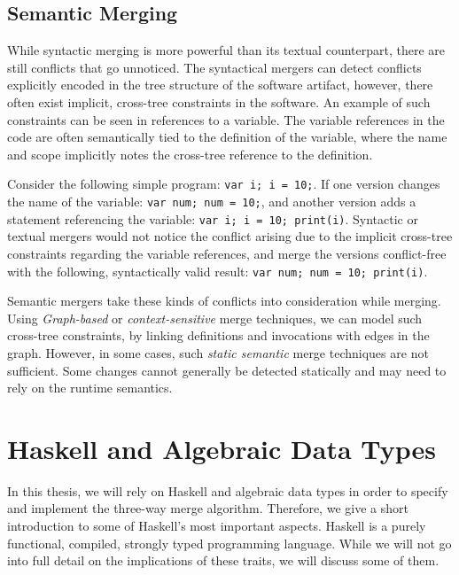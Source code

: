 \documentclass[a4paper,english]{ifimaster}
\begin{document}
\subsection{Semantic Merging}%
\label{sub:semantic_merging}

While syntactic merging is more powerful than its textual counterpart, there are still conflicts that go unnoticed. The syntactical mergers can detect conflicts explicitly encoded in the tree structure of the software artifact, however, there often exist implicit, cross-tree constraints in the software. An example of such constraints can be seen in references to a variable. The variable references in the code are often semantically tied to the definition of the variable, where the name and scope implicitly notes the cross-tree reference to the definition.

Consider the following simple program: \texttt{var i; i = 10;}. If one version changes the name of the variable: \texttt{var num; num = 10;}, and another version adds a statement referencing the variable: \texttt{var i; i = 10; print(i)}. Syntactic or textual mergers would not notice the conflict arising due to the implicit cross-tree constraints regarding the variable references, and merge the versions conflict-free with the following, syntactically valid result: \texttt{var num; num = 10; print(i)}.

Semantic mergers take these kinds of conflicts into consideration while merging. Using \textit{Graph-based}  or \textit{context-sensitive} merge techniques, we can model such cross-tree constraints, by linking definitions and invocations with edges in the graph. However, in some cases, such \textit{static semantic} merge techniques are not sufficient. Some changes cannot generally be detected statically and may need to rely on the runtime semantics.

\section{Haskell and Algebraic Data Types}%
\label{sec:haskell_and_algebraic_data_types}

In this thesis, we will rely on Haskell and algebraic data types in order to specify and implement the three-way merge algorithm. Therefore, we give a short introduction to some of Haskell's most important aspects. Haskell is a purely functional, compiled, strongly typed programming language. While we will not go into full detail on the implications of these traits, we will discuss some of them.
\end{document}
